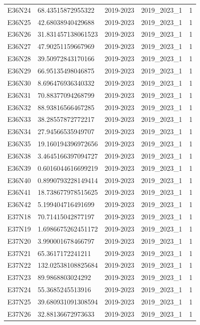 \begin{landscape}
\begin{longtable}{lllll}
E36N24 & 68.43515872955322 & 2019-2023 & 2019\_2023\_1 & 1 \\
E36N25 & 42.68038940429688 & 2019-2023 & 2019\_2023\_1 & 1 \\
E36N26 & 31.831457138061523 & 2019-2023 & 2019\_2023\_1 & 1 \\
E36N27 & 47.90251159667969 & 2019-2023 & 2019\_2023\_1 & 1 \\
E36N28 & 39.50972843170166 & 2019-2023 & 2019\_2023\_1 & 1 \\
E36N29 & 66.95135498046875 & 2019-2023 & 2019\_2023\_1 & 1 \\
E36N30 & 8.696476936340332 & 2019-2023 & 2019\_2023\_1 & 1 \\
E36N31 & 70.88377094268799 & 2019-2023 & 2019\_2023\_1 & 1 \\
E36N32 & 88.93816566467285 & 2019-2023 & 2019\_2023\_1 & 1 \\
E36N33 & 38.28557872772217 & 2019-2023 & 2019\_2023\_1 & 1 \\
E36N34 & 27.94566535949707 & 2019-2023 & 2019\_2023\_1 & 1 \\
E36N35 & 19.160194396972656 & 2019-2023 & 2019\_2023\_1 & 1 \\
E36N38 & 3.4645166397094727 & 2019-2023 & 2019\_2023\_1 & 1 \\
E36N39 & 0.6016044616699219 & 2019-2023 & 2019\_2023\_1 & 1 \\
E36N40 & 0.8990793228149414 & 2019-2023 & 2019\_2023\_1 & 1 \\
E36N41 & 18.738677978515625 & 2019-2023 & 2019\_2023\_1 & 1 \\
E36N42 & 5.199404716491699 & 2019-2023 & 2019\_2023\_1 & 1 \\
E37N18 & 70.71415042877197 & 2019-2023 & 2019\_2023\_1 & 1 \\
E37N19 & 1.6986675262451172 & 2019-2023 & 2019\_2023\_1 & 1 \\
E37N20 & 3.990001678466797 & 2019-2023 & 2019\_2023\_1 & 1 \\
E37N21 & 65.3617172241211 & 2019-2023 & 2019\_2023\_1 & 1 \\
E37N22 & 132.02538108825684 & 2019-2023 & 2019\_2023\_1 & 1 \\
E37N23 & 89.9868803024292 & 2019-2023 & 2019\_2023\_1 & 1 \\
E37N24 & 55.3685245513916 & 2019-2023 & 2019\_2023\_1 & 1 \\
E37N25 & 39.680931091308594 & 2019-2023 & 2019\_2023\_1 & 1 \\
E37N26 & 32.88136672973633 & 2019-2023 & 2019\_2023\_1 & 1 \\

\end{longtable}
\end{landscape}
